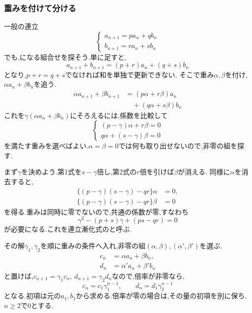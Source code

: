   \subsubsection{重みを付けて分ける}
    一般の連立
    \[
      \begin{cases}
        a_{n+1}=pa_n+qb_n\\
        b_{n+1}=ra_n+sb_n
      \end{cases}
    \]
    でも,になる組合せを探そう.単に足すと,
    \[
      a_{n+1}+b_{n+1}=(p+r)a_n+(q+s)b_n
    \]
    となり,$p+r=q+s$でなければ和を単独で更新できない.
    そこで重み$\alpha,\beta$を付け,$\alpha a_n+\beta b_n$を追う.
    \[
      \begin{aligned}
        \alpha a_{n+1}+\beta b_{n+1}
          &=(p\alpha+r\beta)a_n\\
          &\quad+(q\alpha+s\beta)b_n
      \end{aligned}
    \]
    これを$\gamma(\alpha a_n+\beta b_n)$にそろえるには,係数を比較して
    \[
      \begin{cases}
        (p-\gamma)\alpha+r\beta=0\\
        q\alpha+(s-\gamma)\beta=0
      \end{cases}
    \]
    を満たす重みを選べばよい.$\alpha=\beta=0$では何も取り出せないので,非零の組を探す.

    まず$\gamma$を決めよう.第1式を$s-\gamma$倍し,第2式の$r$倍を引けば$\beta$が消える.
    同様に$\alpha$を消去すると,
    \begin{align*}
      \{(p-\gamma)(s-\gamma)-qr\}\alpha&=0,\\
      \{(p-\gamma)(s-\gamma)-qr\}\beta&=0
    \end{align*}
    を得る.重みは同時に零でないので,共通の係数が零,すなわち
    \[
      \gamma^2-(p+s)\gamma+(ps-qr)=0
    \]
    が必要になる.これを連立漸化式のと呼ぶ.

    その解$\gamma_1,\gamma_2$を順に重みの条件へ入れ,非零の組$(\alpha,\beta),(\alpha',\beta')$を選ぶ.
    \begin{align*}
      c_n&=\alpha a_n+\beta b_n,\\
      d_n&=\alpha'a_n+\beta'b_n
    \end{align*}
    と置けば,$c_{n+1}=\gamma_1c_n,\ d_{n+1}=\gamma_2d_n$なので,倍率が非零なら,
    \[
      c_n=c_1\gamma_1^{n-1},\qquad
      d_n=d_1\gamma_2^{n-1}
    \]
    となる.初項は元の$a_1,b_1$から求める.倍率が零の場合は,その量の初項を別に保ち,$n\ge2$で$0$とする.

